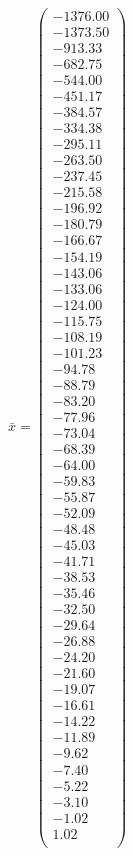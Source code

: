 \documentclass[a4paper,12pt]{article}
\begin{document}
$\bar { x } = \begin{pmatrix}
-1376.00 \\
-1373.50 \\
-913.33 \\
-682.75 \\
-544.00 \\
-451.17 \\
-384.57 \\
-334.38 \\
-295.11 \\
-263.50 \\
-237.45 \\
-215.58 \\
-196.92 \\
-180.79 \\
-166.67 \\
-154.19 \\
-143.06 \\
-133.06 \\
-124.00 \\
-115.75 \\
-108.19 \\
-101.23 \\
-94.78 \\
-88.79 \\
-83.20 \\
-77.96 \\
-73.04 \\
-68.39 \\
-64.00 \\
-59.83 \\
-55.87 \\
-52.09 \\
-48.48 \\
-45.03 \\
-41.71 \\
-38.53 \\
-35.46 \\
-32.50 \\
-29.64 \\
-26.88 \\
-24.20 \\
-21.60 \\
-19.07 \\
-16.61 \\
-14.22 \\
-11.89 \\
-9.62 \\
-7.40 \\
-5.22 \\
-3.10 \\
-1.02 \\
1.02 \\
\end{pmatrix}
$
\end{document}
